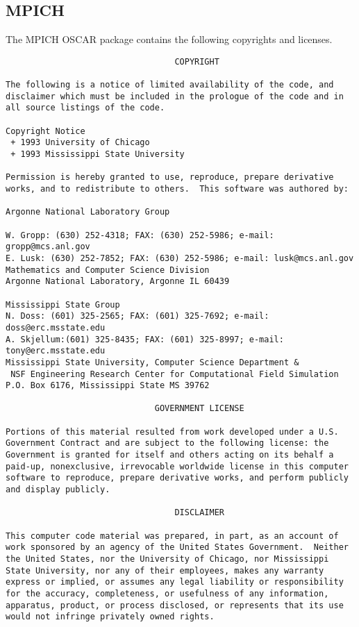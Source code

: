 %
%
%

\subsection{MPICH}
The MPICH OSCAR package contains the following copyrights and
licenses.

\begin{verbatim}
                                  COPYRIGHT

The following is a notice of limited availability of the code, and
disclaimer which must be included in the prologue of the code and in
all source listings of the code.

Copyright Notice
 + 1993 University of Chicago
 + 1993 Mississippi State University

Permission is hereby granted to use, reproduce, prepare derivative
works, and to redistribute to others.  This software was authored by:

Argonne National Laboratory Group

W. Gropp: (630) 252-4318; FAX: (630) 252-5986; e-mail:
gropp@mcs.anl.gov
E. Lusk: (630) 252-7852; FAX: (630) 252-5986; e-mail: lusk@mcs.anl.gov
Mathematics and Computer Science Division
Argonne National Laboratory, Argonne IL 60439

Mississippi State Group
N. Doss: (601) 325-2565; FAX: (601) 325-7692; e-mail:
doss@erc.msstate.edu
A. Skjellum:(601) 325-8435; FAX: (601) 325-8997; e-mail:
tony@erc.msstate.edu
Mississippi State University, Computer Science Department &
 NSF Engineering Research Center for Computational Field Simulation
P.O. Box 6176, Mississippi State MS 39762

                              GOVERNMENT LICENSE

Portions of this material resulted from work developed under a U.S.
Government Contract and are subject to the following license: the
Government is granted for itself and others acting on its behalf a
paid-up, nonexclusive, irrevocable worldwide license in this computer
software to reproduce, prepare derivative works, and perform publicly
and display publicly.

                                  DISCLAIMER

This computer code material was prepared, in part, as an account of
work sponsored by an agency of the United States Government.  Neither
the United States, nor the University of Chicago, nor Mississippi
State University, nor any of their employees, makes any warranty
express or implied, or assumes any legal liability or responsibility
for the accuracy, completeness, or usefulness of any information,
apparatus, product, or process disclosed, or represents that its use
would not infringe privately owned rights.
\end{verbatim}
